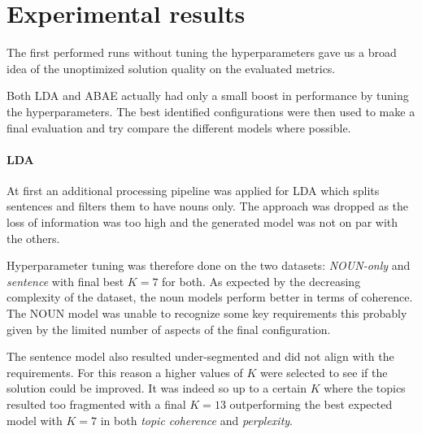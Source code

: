 \section{Experimental results}
The first performed runs without tuning the hyperparameters gave us a broad idea
of the unoptimized solution quality on the evaluated metrics.

Both LDA and ABAE actually had only a small boost in performance by tuning the hyperparameters.
The best identified configurations were then used to make a final evaluation and try compare the different models where possible.

\paragraph{LDA}
At first an additional processing pipeline was applied for LDA which splits sentences and filters them to have nouns only.
The approach was dropped as the loss of information was too high and the generated model was not on par with the others.

Hyperparameter tuning was therefore done on the two datasets: \textit{NOUN-only} and \textit{sentence} with final best $K=7$ for both.
As expected by the decreasing complexity of the dataset, the noun models perform better in terms of coherence.
The NOUN model was unable to recognize some key requirements this probably given by the limited number of aspects of the final configuration.

The sentence model also resulted under-segmented and did not align with the requirements.
For this reason a higher values of $K$ were selected to see if the solution could be improved.
It was indeed so up to a certain $K$ where the topics resulted too fragmented with a final $K=13$ outperforming
the best expected model with $K=7$ in both \textit{topic coherence} and \textit{perplexity}.

